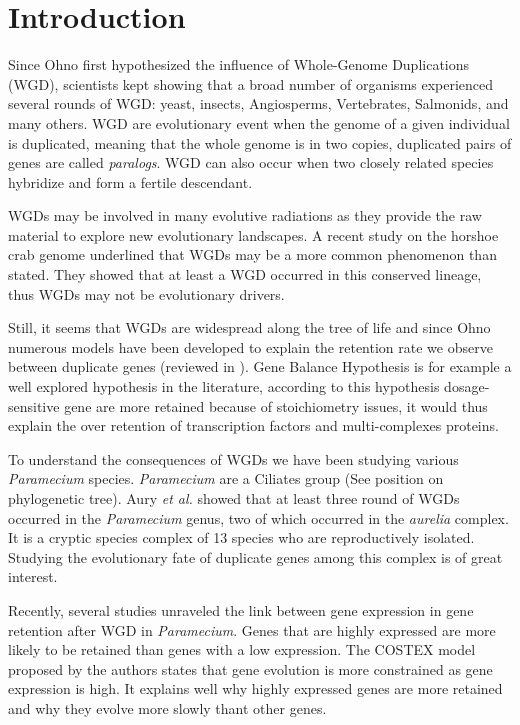 \section*{Introduction}

Since Ohno first hypothesized the influence of Whole-Genome Duplications (WGD), scientists kept showing that a broad number of organisms experienced several rounds of WGD: yeast, insects, Angiosperms, Vertebrates, Salmonids, and many others. WGD are evolutionary event when the genome of a given individual is duplicated, meaning that the whole genome is in two copies, duplicated pairs of genes are called \textit{paralogs}. WGD can also occur when two closely related species hybridize and form a fertile descendant.

WGDs may be involved in many evolutive radiations as they provide the raw material to explore new evolutionary landscapes. A recent study on the horshoe crab genome underlined that WGDs may be a more common phenomenon than stated. They showed that at least a WGD occurred in this conserved lineage, thus WGDs may not be evolutionary drivers.

Still, it seems that WGDs are widespread along the tree of life and since Ohno numerous models have been developed to explain the retention rate we observe between duplicate genes (reviewed in ). Gene Balance Hypothesis is for example a well explored hypothesis in the literature, according to this hypothesis dosage-sensitive gene are more retained because of stoichiometry issues, it would thus explain the over retention of transcription factors and multi-complexes proteins.

To understand the consequences of WGDs we have been studying various \textit{Paramecium} species. \textit{Paramecium} are a Ciliates group (See position on phylogenetic tree). Aury \textit{et al.} showed that at least three round of WGDs occurred in the \textit{Paramecium} genus, two of which occurred in the \textit{aurelia} complex. It is a cryptic species complex of 13 species who are reproductively isolated. Studying the evolutionary fate of duplicate genes among this complex is of great interest.

Recently, several studies unraveled the link between gene expression in gene retention after WGD in \textit{Paramecium}. Genes that are highly expressed are more likely to be retained than genes with a low expression. The COSTEX model proposed by the authors states that gene evolution is more constrained as gene expression is high. It explains well why highly expressed genes are more retained and why they evolve more slowly thant other genes.


